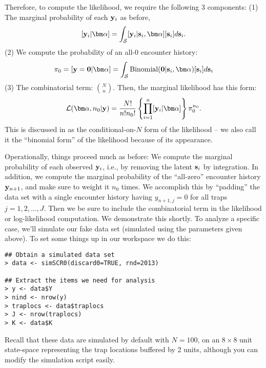 Therefore, to compute the likelihood, we require 
the following 3 components: (1) The marginal
probability of each ${\bf y}_{i}$ as before,
\[
  [{\bf y}_{i}|{\bm \alpha}] = 
\int_{{\cal S}} [{\bf y}_{i} |{\bf s}_{i}, {\bm
  \alpha}] [{\bf s}_{i}] d{\bf s}_{i}.
\]
(2) We compute
the probability of an all-0 encounter history:
\[
\pi_{0} = [{\bf y} = {\bf 0} | {\bm \alpha}] = 
\int_{{\cal S}} \mbox{Binomial}({\bf 0} |{\bf s}_{i}, {\bm \alpha})[{\bf s}_{i}] d{\bf s}_{i}
\]
(3) The combinatorial term: ${N \choose n}$. Then, 
 the marginal likelihood has this form:
\begin{equation}
 {\cal L}({\bm \alpha}, n_{0}| {\bf y})  = \frac{N!}{n! n_{0}!}
 \left\{ \prod_{i=1}^{n}  [{\bf y}_{i}|{\bm \alpha}] \right\}
\pi_{0}^{n_{0}}.
\label{mle.eq.binomialform}
\end{equation}
This is discussed in \citet[][p. 379]{borchers_efford:2008} as the
conditional-on-$N$ form of the likelihood -- we also call it
the ``binomial form'' of the likelihood because of its appearance. 

Operationally, things proceed much as before: We compute the marginal
probability of each observed ${\bf y}_{i}$, i.e., by removing the
latent ${\bf s}_{i}$ by integration. In addition, we compute the
marginal probability of the ``all-zero'' encounter history ${\bf
  y}_{n+1}$, and make sure to weight it $n_{0}$ times. We accomplish
this by ``padding'' the data set with a single encounter history
having $y_{n+1,j}=0$ for all traps $j=1,2,\ldots,J$. Then we be sure
to include the combinatorial term in the likelihood or log-likelihood
computation. We demonstrate this shortly.  To analyze a specific case,
we'll simulate our fake data set (simulated using the parameters given
above). To set some things up in our workspace we do this:
\begin{verbatim}
## Obtain a simulated data set
> data <- simSCR0(discard0=TRUE, rnd=2013)  

## Extract the items we need for analysis
> y <- data$Y
> nind <- nrow(y)
> traplocs <- data$traplocs
> J <- nrow(traplocs)
> K <- data$K
\end{verbatim}
Recall that these data are simulated by default with $N=100$, on an $8 \times 8$ unit
state-space representing the trap locations  buffered by 2 units,
although you can modify the simulation script easily.


